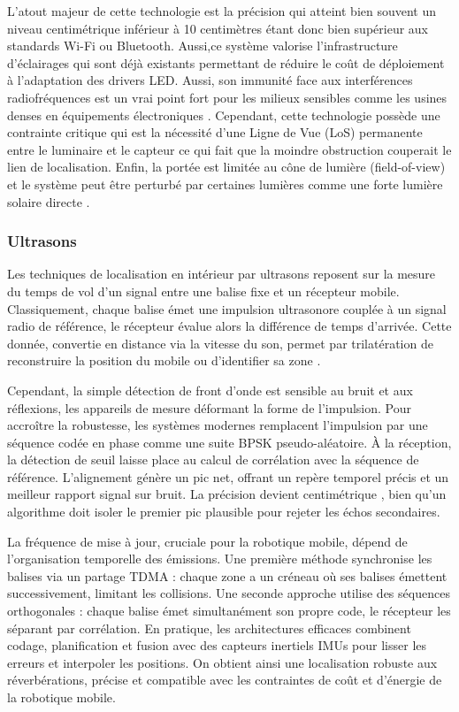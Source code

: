 \documentclass[11pt, a4paper]{article}
\begin{document}
L’atout majeur de cette technologie est la précision qui atteint bien souvent un niveau centimétrique inférieur à 10 centimètres étant donc bien supérieur aux standards Wi-Fi ou Bluetooth. Aussi,ce système valorise l’infrastructure d’éclairages qui sont déjà existants permettant de réduire le coût de déploiement à l’adaptation des drivers LED. Aussi, son immunité face aux interférences radiofréquences est un vrai point fort pour les milieux sensibles comme les usines denses en équipements électroniques \cite{retscherIndoorNavigationUser2022}. Cependant, cette technologie possède une contrainte critique qui est la nécessité d’une Ligne de Vue (LoS) permanente entre le luminaire et le capteur ce qui fait que la moindre obstruction couperait le lien de localisation. Enfin, la portée est limitée au cône de lumière (field-of-view) et le système peut être perturbé par certaines lumières comme une forte lumière solaire directe \cite{sesyukSurvey3DIndoor2022}.

\subsubsection{Ultrasons}

Les techniques de localisation en intérieur par ultrasons reposent sur la mesure du temps de vol d'un signal entre une balise fixe et un récepteur mobile. Classiquement, chaque balise émet une impulsion ultrasonore couplée à un signal radio de référence, le récepteur évalue alors la différence de temps d’arrivée. Cette donnée, convertie en distance via la vitesse du son, permet par trilatération de reconstruire la position du mobile ou d'identifier sa zone \cite{priyanthaCricketLocationsupportSystem2000}.

Cependant, la simple détection de front d’onde est sensible au bruit et aux réflexions, les appareils de mesure déformant la forme de l’impulsion. Pour accroître la robustesse, les systèmes modernes remplacent l’impulsion par une séquence codée en phase comme une suite BPSK pseudo-aléatoire. À la réception, la détection de seuil laisse place au calcul de corrélation avec la séquence de référence. L'alignement génère un pic net, offrant un repère temporel précis et un meilleur rapport signal sur bruit. La précision devient centimétrique \cite{piontekImprovingAccuracyUltrasoundbased2007}, bien qu'un algorithme doit isoler le premier pic plausible pour rejeter les échos secondaires.

La fréquence de mise à jour, cruciale pour la robotique mobile, dépend de l'organisation temporelle des émissions. Une première méthode synchronise les balises via un partage TDMA : chaque zone a un créneau où ses balises émettent successivement, limitant les collisions. Une seconde approche utilise des séquences orthogonales : chaque balise émet simultanément son propre code, le récepteur les séparant par corrélation. En pratique, les architectures efficaces combinent codage, planification et fusion avec des capteurs inertiels IMUs pour lisser les erreurs et interpoler les positions. On obtient ainsi une localisation robuste aux réverbérations, précise et compatible avec les contraintes de coût et d'énergie de la robotique mobile.
\end{document}

